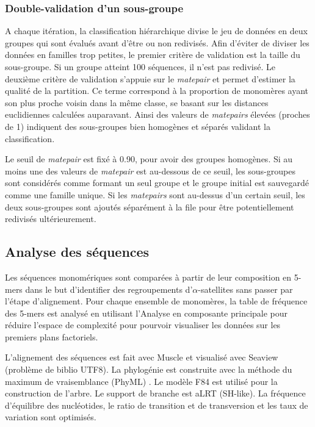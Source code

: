 \documentclass[12pt,a4paper]{article}
\begin{document}
	\subsubsection{Double-validation d'un sous-groupe}
A chaque itération, la classification hiérarchique divise le jeu de données en deux groupes qui sont évalués avant d'être ou non redivisés. Afin d'éviter de diviser les données en familles trop petites, le premier critère de validation est la taille du sous-groupe. Si un groupe atteint 100 séquences, il n'est pas redivisé. Le deuxième critère de validation s'appuie sur le \textit{matepair} et permet d'estimer la qualité de la partition. Ce terme correspond à la proportion de monomères ayant son plus proche voisin dans la même classe, se basant sur les distances euclidiennes calculées auparavant. Ainsi des valeurs de \textit{matepairs} élevées (proches de 1) indiquent des sous-groupes bien homogènes et séparés validant la classification.

Le seuil de \textit{matepair} est fixé à 0.90, pour avoir des groupes homogènes. Si au moins une des valeurs de \textit{matepair} est au-dessous de ce seuil, les sous-groupes sont considérés comme formant un seul groupe et le groupe initial est sauvegardé comme une famille unique. Si les \textit{matepairs} sont au-dessus d’un certain seuil, les deux sous-groupes sont ajoutés séparément à la file pour être potentiellement redivisés ultérieurement.

	\subsection{Analyse des séquences}
	
Les séquences monomériques sont comparées à partir de leur composition en 5-mers dans le but d'identifier des regroupements d'$\alpha$-satellites sans passer par l'étape d'alignement. Pour chaque ensemble de monomères,	la table de fréquence des 5-mers est analysé en utilisant l'Analyse en composante principale pour réduire l'espace de complexité pour pourvoir visualiser les données sur les premiers plans factoriels.
	
L'alignement des séquences est fait avec Muscle \cite{Edgar2004} et visualisé avec Seaview (problème de biblio UTF8). La phylogénie est construite avec la méthode du maximum de vraisemblance (PhyML) \cite{Guindon2009}. Le modèle F84 est utilisé pour la construction de l'arbre. Le support de branche est aLRT (SH-like). La fréquence d'équilibre des nucléotides, le ratio de transition et de transversion et les taux de variation sont optimisés.
\end{document}
